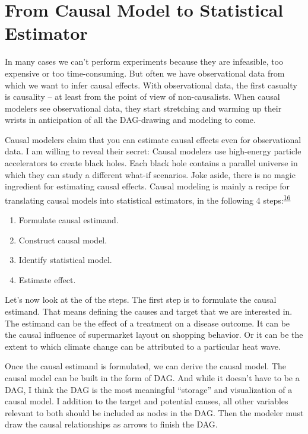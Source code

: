 \documentclass[
  10pt,
]{scrbook}
\providecommand{\tightlist}{%
  \setlength{\itemsep}{0pt}\setlength{\parskip}{0pt}}
\begin{document}
\hypertarget{from-causal-model-to-statistical-estimator}{%
\section{From Causal Model to Statistical Estimator}\label{from-causal-model-to-statistical-estimator}}

In many cases we can't perform experiments because they are infeasible, too expensive or too time-consuming.
But often we have observational data from which we want to infer causal effects.
With observational data, the first casualty is causality -- at least from the point of view of non-causalists.
When causal modelers see observational data, they start stretching and warming up their wrists in anticipation of all the DAG-drawing and modeling to come.

Causal modelers claim that you can estimate causal effects even for observational data.
I am willing to reveal their secret:
Causal modelers use high-energy particle accelerators to create black holes.
Each black hole contains a parallel universe in which they can study a different what-if scenarios.
Joke aside, there is no magic ingredient for estimating causal effects.
Causal modeling is mainly a recipe for translating causal models into statistical estimators, in the following 4 steps:\textsuperscript{\protect\hyperlink{ref-pearl2009causal}{16}}

\begin{enumerate}
\def\labelenumi{\arabic{enumi}.}
\tightlist
\item
  Formulate causal estimand.
\item
  Construct causal model.
\item
  Identify statistical model.
\item
  Estimate effect.
\end{enumerate}

Let's now look at the of the steps.
The first step is to formulate the causal estimand.
That means defining the causes and target that we are interested in.
The estimand can be the effect of a treatment on a disease outcome.
It can be the causal influence of supermarket layout on shopping behavior.
Or it can be the extent to which climate change can be attributed to a particular heat wave.

Once the causal estimand is formulated, we can derive the causal model.
The causal model can be built in the form of DAG.
And while it doesn't have to be a DAG, I think the DAG is the most meaningful ``storage'' and visualization of a causal model.
I addition to the target and potential causes, all other variables relevant to both should be included as nodes in the DAG.
Then the modeler must draw the causal relationships as arrows to finish the DAG.
\end{document}
